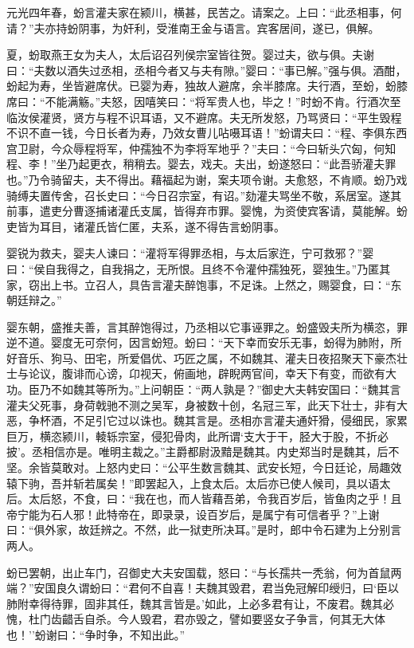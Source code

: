 \documentclass[]{article}
\begin{document}
元光四年春，蚡言灌夫家在颍川，横甚，民苦之。请案之。上曰：``此丞相事，何请？''夫亦持蚡阴事，为奸利，受淮南王金与语言。宾客居间，遂已，俱解。

夏，蚡取燕王女为夫人，太后诏召列侯宗室皆往贺。婴过夫，欲与俱。夫谢曰：``夫数以酒失过丞相，丞相今者又与夫有隙。''婴曰：``事已解。''强与俱。酒酣，蚡起为寿，坐皆避席伏。已婴为寿，独故人避席，余半膝席。夫行酒，至蚡，蚡膝席曰：``不能满觞。''夫怒，因嘻笑曰：``将军贵人也，毕之！''时蚡不肯。行酒次至临汝侯灌贤，贤方与程不识耳语，又不避席。夫无所发怒，乃骂贤曰：``平生毁程不识不直一钱，今日长者为寿，乃效女曹儿呫嗫耳语！''蚡谓夫曰：``程、李俱东西宫卫尉，今众辱程将军，仲孺独不为李将军地乎？''夫曰：``今曰斩头穴匈，何知程、李！''坐乃起更衣，稍稍去。婴去，戏夫。夫出，蚡遂怒曰：``此吾骄灌夫罪也。''乃令骑留夫，夫不得出。藉福起为谢，案夫项令谢。夫愈怒，不肯顺。蚡乃戏骑缚夫置传舍，召长史曰：``今日召宗室，有诏。''劾灌夫骂坐不敬，系居室。遂其前事，遣吏分曹逐捕诸灌氏支属，皆得弃市罪。婴愧，为资使宾客请，莫能解。蚡吏皆为耳目，诸灌氏皆仁匿，夫系，遂不得告言蚡阴事。

婴锐为救夫，婴夫人谏曰：``灌将军得罪丞相，与太后家迕，宁可救邪？''婴曰：``侯自我得之，自我捐之，无所恨。且终不令灌仲孺独死，婴独生。''乃匿其家，窃出上书。立召人，具告言灌夫醉饱事，不足诛。上然之，赐婴食，曰：``东朝廷辩之。''

婴东朝，盛推夫善，言其醉饱得过，乃丞相以它事诬罪之。蚡盛毁夫所为横恣，罪逆不道。婴度无可奈何，因言蚡短。蚡曰：``天下幸而安乐无事，蚡得为肺附，所好音乐、狗马、田宅，所爱倡优、巧匠之属，不如魏其、灌夫日夜招聚天下豪杰壮士与论议，腹诽而心谤，卬视天，俯画地，辟睨两官间，幸天下有变，而欲有大功。臣乃不如魏其等所为。''上问朝臣：``两人孰是？''御史大夫韩安国曰：``魏其言灌夫父死事，身荷戟驰不测之吴军，身被数十创，名冠三军，此天下壮士，非有大恶，争杯酒，不足引它过以诛也。魏其言是。丞相亦言灌夫通奸猾，侵细民，家累巨万，横恣颍川，輘轹宗室，侵犯骨肉，此所谓`支大于干，胫大于股，不折必披'。丞相信亦是。唯明主裁之。''主爵都尉汲黯是魏其。内史郑当时是魏其，后不坚。余皆莫敢对。上怒内史曰：``公平生数言魏其、武安长短，今日廷论，局趣效辕下驹，吾并斩若属矣！''即罢起入，上食太后。太后亦已使人候司，具以语太后。太后怒，不食，曰：``我在也，而人皆藉吾弟，令我百岁后，皆鱼肉之乎！且帝宁能为石人邪！此特帝在，即录录，设百岁后，是属宁有可信者乎？''上谢曰：``俱外家，故廷辨之。不然，此一狱吏所决耳。''是时，郎中令石建为上分别言两人。

蚡已罢朝，出止车门，召御史大夫安国载，怒曰：``与长孺共一秃翁，何为首鼠两端？''安国良久谓蚡曰：``君何不自喜！夫魏其毁君，君当免冠解印绶归，曰`臣以肺附幸得待罪，固非其任，魏其言皆是。'如此，上必多君有让，不废君。魏其必愧，杜门齿齰舌自杀。今人毁君，君亦毁之，譬如要竖女子争言，何其无大体也！''蚡谢曰：``争时争，不知出此。''
\end{document}
